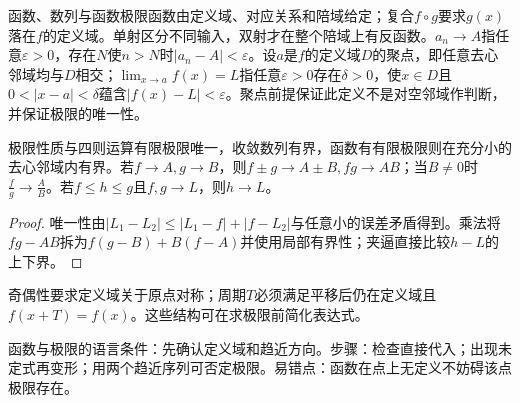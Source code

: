 \begin{definition}{函数、数列与函数极限}函数由定义域、对应关系和陪域给定；复合$f\circ g$要求$g(x)$落在$f$的定义域。单射区分不同输入，双射才在整个陪域上有反函数。$a_n\to A$指任意$\varepsilon>0$，存在$N$使$n>N$时$|a_n-A|<\varepsilon$。设$a$是$f$的定义域$D$的聚点，即任意去心邻域均与$D$相交；$\lim_{x\to a}f(x)=L$指任意$\varepsilon>0$存在$\delta>0$，使$x\in D$且$0<|x-a|<\delta$蕴含$|f(x)-L|<\varepsilon$。聚点前提保证此定义不是对空邻域作判断，并保证极限的唯一性。\end{definition}
\begin{theorem}{极限性质与四则运算}有限极限唯一，收敛数列有界，函数有有限极限则在充分小的去心邻域内有界。若$f\to A,g\to B$，则$f\pm g\to A\pm B,fg\to AB$；当$B\ne0$时$\frac{f}{g}\to \frac{A}{B}$。若$f\le h\le g$且$f,g\to L$，则$h\to L$。\end{theorem}
\begin{proof}唯一性由$|L_1-L_2|\le|L_1-f|+|f-L_2|$与任意小的误差矛盾得到。乘法将$fg-AB$拆为$f(g-B)+B(f-A)$并使用局部有界性；夹逼直接比较$h-L$的上下界。\end{proof}
奇偶性要求定义域关于原点对称；周期$T$必须满足平移后仍在定义域且$f(x+T)=f(x)$。这些结构可在求极限前简化表达式。

\begin{method}{函数与极限的语言}条件：先确认定义域和趋近方向。步骤：检查直接代入；出现未定式再变形；用两个趋近序列可否定极限。易错点：函数在点上无定义不妨碍该点极限存在。\end{method}

